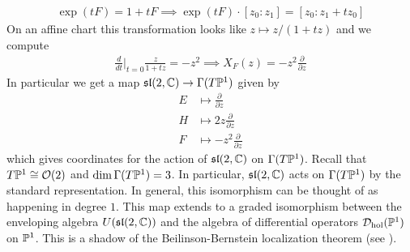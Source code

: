 \begin{example}
\begin{align*}
        \exp(tF) = 1 + tF \implies \exp(tF)\cdot [z_0:z_1] = [z_0 : z_1 + tz_0]
    \end{align*} On an affine chart this transformation looks like $z\mapsto z/(1+tz)$
    and we compute \begin{align*}
        \frac{d}{dt}\Big|_{t=0} \frac{z}{1+tz} = -z^2 \implies X_F(z) = -z^2\frac{\partial}{\partial z}
    \end{align*} In particular we get a map $\mf{sl}(2,\C) \to \Gamma(T\P^1)$ given by
    \begin{align*}
        E &\mapsto \frac{\partial}{\partial z} \\
        H &\mapsto 2z\frac{\partial}{\partial z} \\
        F &\mapsto -z^2\frac{\partial}{\partial z}
    \end{align*} which gives coordinates for the action of $\mf{sl}(2,\C)$ on $\Gamma(T\P^1)$.
    Recall that $T\P^1 \cong \cO(2)$ and $\dim \Gamma(T\P^1) = 3$. In particular, $\mf{sl}(2,\C)$
    acts on $\Gamma(T\P^1)$ by the standard representation. In general, this isomorphism can be thought of as 
    happening in degree $1$. This map extends to a graded isomorphism between the enveloping algebra $U(\mf{sl}(2,\C))$ and 
    the algebra of differential operators $\cD_{\text{hol}}(\P^1)$ on $\P^1$. This is a 
    shadow of the Beilinson-Bernstein localization theorem (see \cite{htt}).
\end{example}


